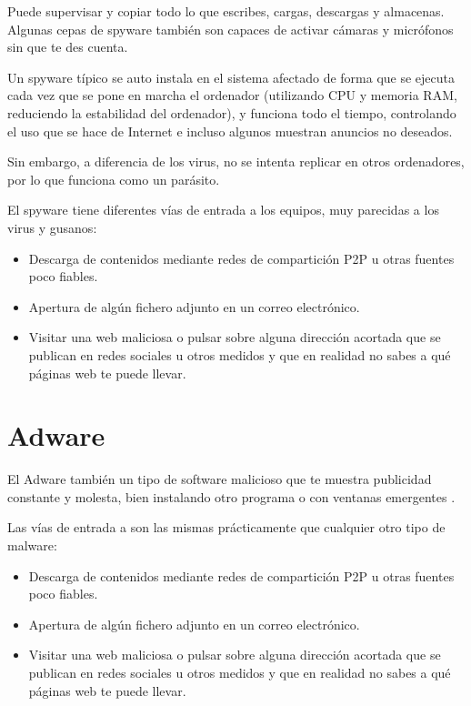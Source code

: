 \documentclass[
  a4paper,
  openany]{book}
\begin{document}
Puede supervisar y copiar todo lo que escribes, cargas, descargas y almacenas. Algunas cepas de spyware también son capaces de activar cámaras y micrófonos sin que te des cuenta.

Un spyware típico se auto instala en el sistema afectado de forma que se ejecuta cada vez que se pone en marcha el ordenador (utilizando CPU y memoria RAM, reduciendo la estabilidad del ordenador), y funciona todo el tiempo, controlando el uso que se hace de Internet e incluso algunos muestran anuncios no deseados.

Sin embargo, a diferencia de los virus, no se intenta replicar en otros ordenadores, por lo que funciona como un parásito.

El spyware tiene diferentes vías de entrada a los equipos, muy parecidas a los virus y gusanos:

\begin{itemize}
\item
  Descarga de contenidos mediante redes de compartición P2P u otras fuentes poco fiables.
\item
  Apertura de algún fichero adjunto en un correo electrónico.
\item
  Visitar una web maliciosa o pulsar sobre alguna dirección acortada que se publican en redes sociales u otros medidos y que en realidad no sabes a qué páginas web te puede llevar.
\end{itemize}

\hypertarget{adware}{%
\section{Adware}\label{adware}}

El Adware también un tipo de software malicioso que te muestra publicidad constante y molesta, bien instalando otro programa o con ventanas emergentes \citep{AVAST-adware}.

Las vías de entrada a son las mismas prácticamente que cualquier otro tipo de malware:

\begin{itemize}
\item
  Descarga de contenidos mediante redes de compartición P2P u otras fuentes poco fiables.
\item
  Apertura de algún fichero adjunto en un correo electrónico.
\item
  Visitar una web maliciosa o pulsar sobre alguna dirección acortada que se publican en redes sociales u otros medidos y que en realidad no sabes a qué páginas web te puede llevar.
\end{itemize}
\end{document}
